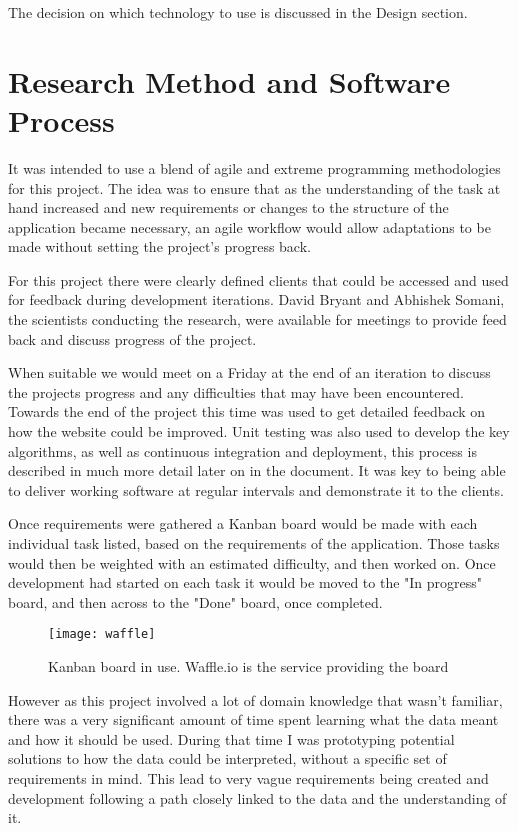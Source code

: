 The decision on which technology to use is discussed in the Design section. 

\section{Research Method and Software Process}
It was intended to use a blend of agile and extreme programming methodologies for this project. The idea was to ensure that as the understanding of the task at hand increased and new requirements or changes to the structure of the application became necessary, an agile workflow would allow adaptations to be made without setting the project's progress back. 


For this project there were clearly defined clients that could be accessed and used for feedback during development iterations. David Bryant and Abhishek Somani, the scientists conducting the research, were available for meetings to provide feed back and discuss progress of the project. 

When suitable we would meet on a Friday at the end of an iteration to discuss the projects progress and any difficulties that may have been encountered. Towards the end of the project this time was used to get detailed feedback on how the website could be improved. 
Unit testing was also used to develop the key algorithms, as well as continuous integration and deployment, this process is described in much more detail later on in the document. It was key to being able to deliver working software at regular intervals and demonstrate it to the clients. 

Once requirements were gathered a Kanban board would be made with each individual task listed, based on the requirements of the application. Those tasks would then be weighted with an estimated difficulty, and then worked on. Once development had started on each task it would be moved to the "In progress" board, and then across to the "Done" board, once completed. 

\begin{figure}[ht!]
\begin{center}
\texttt{[image: waffle]}
\caption{Kanban board in use. Waffle.io is the service providing the board}
\end{center}
\end{figure}

However as this project involved a lot of domain knowledge that wasn't familiar, there was a very significant amount of time spent learning what the data meant and how it should be used. During that time I was prototyping potential solutions to how the data could be interpreted, without a specific set of requirements in mind. This lead to very vague requirements being created and development following a path closely linked to the data and the understanding of it. 


